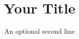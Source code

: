 \title{Your Title}
\subtitle{An optional second line}
\date{}

\begin{frame}[plain]
  \titlepage
\end{frame}
